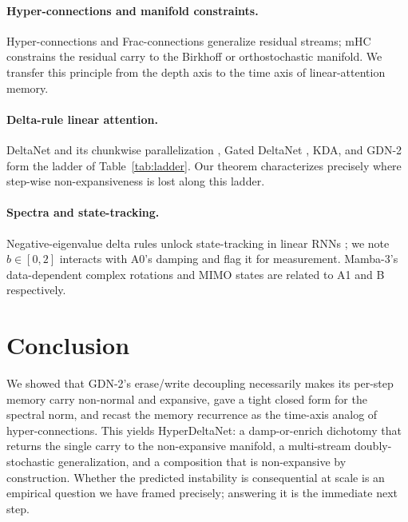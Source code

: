 \documentclass[11pt,letterpaper,logo]{yalearxiv}
\begin{document}
\paragraph{Hyper-connections and manifold constraints.} Hyper-connections
\citep{zhu2024hyperconnections} and Frac-connections \citep{zhu2025fracconnections}
generalize residual streams;
mHC \citep{deepseek2025mhc} constrains the residual carry to the Birkhoff or
orthostochastic manifold. We transfer this principle from the depth axis to the time
axis of linear-attention memory.

\paragraph{Delta-rule linear attention.} DeltaNet \citep{schlag2021linear} and its
chunkwise parallelization \citep{yang2024parallelizing}, Gated DeltaNet
\citep{yang2024gdn}, KDA, and GDN-2 \citep{hatamizadeh2026gdn2} form the ladder of
Table~\ref{tab:ladder}. Our theorem characterizes precisely where step-wise
non-expansiveness is lost along this ladder.

\paragraph{Spectra and state-tracking.} Negative-eigenvalue delta rules unlock
state-tracking in linear RNNs \citep{grazzi2025statetracking}; we note $b\in[0,2]$
interacts with A0's damping and flag it for measurement. Mamba-3's data-dependent
complex rotations and MIMO states are related to A1 and B respectively.


\section{Conclusion}
\label{sec:conclusion}

We showed that GDN-2's erase/write decoupling necessarily makes its per-step memory
carry non-normal and expansive, gave a tight closed form for the spectral norm, and
recast the memory recurrence as the time-axis analog of hyper-connections. This yields
HyperDeltaNet: a damp-or-enrich dichotomy that returns the single carry to the
non-expansive manifold, a multi-stream doubly-stochastic generalization, and a
composition that is non-expansive by construction. Whether the predicted instability
is consequential at scale is an empirical question we have framed precisely; answering
it is the immediate next step.
\end{document}

